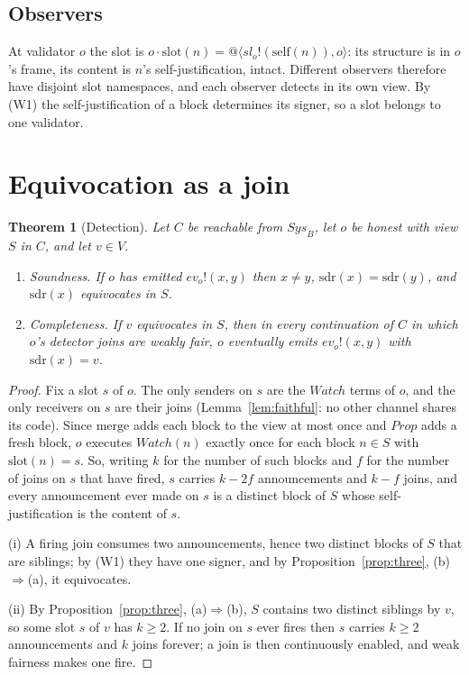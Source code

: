 \documentclass[11pt]{article}
\makeatletter
\newtheorem{theorem}{Theorem}[section]
\theoremstyle{definition}
\theoremstyle{remark}
\newcommand{\snd}[2]{#1!(#2)}
\newcommand{\qn}[2]{@\langle #1, #2\rangle}
\newcommand{\act}[2]{#1\cdot #2}
\newcommand{\slf}{\mathrm{self}}
\newcommand{\slot}{\mathrm{slot}}
\newcommand{\merge}{\mathrm{merge}}
\newcommand{\sender}{\mathrm{sdr}}
\makeatother
\begin{document}
\subsection{Observers}

At validator $o$ the slot is $\act{o}{\slot(n)} =
\qn{\snd{\mathit{sl}_o}{\slf(n)}}{o}$: its structure is in $o$'s frame, its
content is $n$'s self-justification, intact. Different observers therefore
have disjoint slot namespaces, and each observer detects in its own view.
By (W1) the self-justification of a block determines its signer, so a slot
belongs to one validator.

\section{Equivocation as a join}\label{sec:detect}

\begin{theorem}[Detection]\label{thm:detect}
Let $C$ be reachable from $\mathit{Sys}_B$, let $o$ be honest with view $S$ in
$C$, and let $v\in V$.
\begin{enumerate}[label=(\roman*)]
\item \emph{Soundness.} If $o$ has emitted $\snd{\mathit{ev}_o}{x,y}$ then
  $x\ne y$, $\sender(x)=\sender(y)$, and $\sender(x)$ equivocates in $S$.
\item \emph{Completeness.} If $v$ equivocates in $S$, then in every
  continuation of $C$ in which $o$'s detector joins are weakly fair, $o$
  eventually emits $\snd{\mathit{ev}_o}{x,y}$ with $\sender(x)=v$.
\end{enumerate}
\end{theorem}

\begin{proof}
Fix a slot $s$ of $o$. The only senders on $s$ are the $\mathit{Watch}$
terms of $o$, and the only receivers on $s$ are their joins
(Lemma~\ref{lem:faithful}: no other channel shares its code). Since $\merge$
adds each block to the view at most once and $\mathit{Prop}$ adds a fresh
block, $o$ executes $\mathit{Watch}(n)$ exactly once for each block
$n\in S$ with $\slot(n)=s$. So, writing $k$ for the number of such blocks and
$f$ for the number of joins on $s$ that have fired, $s$ carries $k-2f$
announcements and $k-f$ joins, and every announcement ever made on $s$ is a
distinct block of $S$ whose self-justification is the content of $s$.

(i) A firing join consumes two announcements, hence two distinct blocks of
$S$ that are siblings; by (W1) they have one signer, and by
Proposition~\ref{prop:three}, (b)$\Rightarrow$(a), it equivocates.

(ii) By Proposition~\ref{prop:three}, (a)$\Rightarrow$(b), $S$ contains two
distinct siblings by $v$, so some slot $s$ of $v$ has $k\ge2$. If no join on
$s$ ever fires then $s$ carries $k\ge2$ announcements and $k$ joins forever;
a join is then continuously enabled, and weak fairness makes one fire.
\end{proof}
\end{document}
